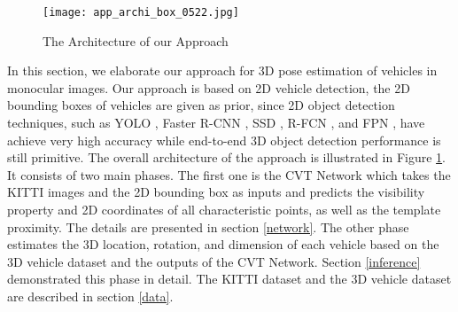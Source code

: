\begin{figure}[h]		
	\texttt{[image: app\_archi\_box\_0522.jpg]}
	\caption{The Architecture of our Approach}
	\centering
	\label{figure:app_archi}
\end{figure}

In this section, we elaborate our approach for 3D pose estimation of vehicles in monocular images. Our approach is based on 2D vehicle detection, \ie the 2D bounding boxes of vehicles are given as prior, since 2D object detection techniques, such as YOLO \cite{DBLP:journals/corr/RedmonF16}, Faster R-CNN \cite{DBLP:journals/corr/RenHG015}, SSD \cite{DBLP:journals/corr/LiuAESR15}, R-FCN \cite{DBLP:journals/corr/DaiLHS16}, and FPN \cite{DBLP:journals/corr/LinDGHHB16},  have achieve very high accuracy while  end-to-end 3D object detection performance is still primitive.  The overall architecture of the approach is illustrated in Figure \ref{figure:app_archi}. It consists of two main phases. The first one is the CVT Network which takes the KITTI images and the 2D bounding box as inputs and predicts the visibility property and 2D coordinates of all characteristic points, as well as the template proximity. The details are presented in section \ref{network}.  The other phase estimates the 3D location, rotation, and dimension of each vehicle based on the 3D vehicle dataset and the outputs of the CVT Network. Section \ref{inference} demonstrated this phase in detail. The KITTI dataset and the 3D vehicle dataset are described in section \ref{data}.


